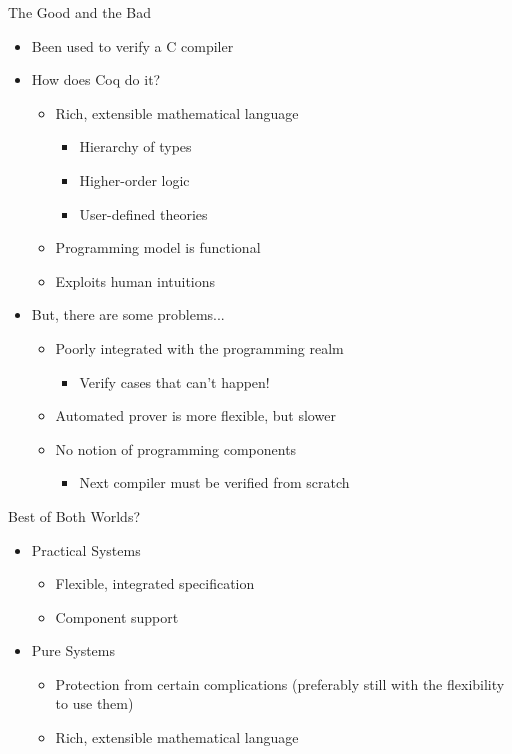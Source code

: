 \documentclass{beamer}
\begin{document}
\begin{frame}{The Good and the Bad}
	\begin{itemize}
		\item Been used to verify a C compiler
		\item How does Coq do it?
		\begin{itemize}
			\item Rich, extensible mathematical language
			\begin{itemize}
				\item Hierarchy of types
				\item Higher-order logic
				\item User-defined theories
			\end{itemize}
			\item Programming model is functional
			\item Exploits human intuitions
		\end{itemize}
		\item But, there are some problems...
		\begin{itemize}
			\item Poorly integrated with the programming realm
			\begin{itemize}
				\item Verify cases that can't happen!
			\end{itemize}
			\item Automated prover is more flexible, but slower
			\item No notion of programming components
			\begin{itemize}
				\item Next compiler must be verified from scratch
			\end{itemize}
		\end{itemize}
	\end{itemize}
\end{frame}


\begin{frame}{Best of Both Worlds?}
	\begin{itemize}
		\item Practical Systems
		\begin{itemize}
			\item Flexible, integrated specification
			\item Component support
		\end{itemize}
		\item Pure Systems
		\begin{itemize}
			\item Protection from certain complications (preferably still with the flexibility to use them)
			\item Rich, extensible mathematical language
		\end{itemize}
	\end{itemize}
\end{frame}
\end{document}
